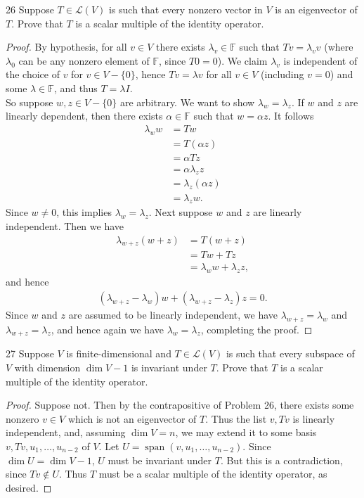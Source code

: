 \documentclass{extarticle}
\newenvironment{problem}[1]{\begin{prob*}{#1}{}}{\end{prob*}}
\newcommand{\F}{\mathbb{F}}
\DeclareMathOperator{\Span}{span}
\newcommand{\Hom}{\mathcal{L}}
\begin{document}
\begin{problem}{26}
Suppose $T\in\Hom(V)$ is such that every nonzero vector in $V$ is an eigenvector of $T$.  Prove that $T$ is a scalar multiple of the identity operator.
\end{problem}
\begin{proof}
By hypothesis, for all $v\in V$ there exists $\lambda_v\in\F$ such that $Tv = \lambda_v v$ (where $\lambda_0$ can be any nonzero element of $\F$, since $T0 = 0$).  We claim $\lambda_v$ is independent of the choice of $v$ for $v\in V-\{0\}$, hence $Tv = \lambda v$ for all $v\in V$ (including $v = 0$) and some $\lambda \in \F$, and thus $T = \lambda I$.\\
\indent So suppose $w,z\in V-\{0\}$ are arbitrary.  We want to show $\lambda_w = \lambda_z$.  If $w$ and $z$ are linearly dependent, then there exists $\alpha\in\F$ such that $w=\alpha z$.  It follows
\begin{align*}
\lambda_w w &= Tw\\
&= T(\alpha z)\\
&= \alpha Tz \\
&= \alpha \lambda_z z\\
&= \lambda_z (\alpha z)\\
&= \lambda_z w.
\end{align*}
Since $w\neq 0$, this implies $\lambda_w = \lambda_z$.  Next suppose $w$ and $z$ are linearly independent.  Then we have
\begin{align*}
\lambda_{w + z} (w + z)&= T(w + z)\\
&= Tw + Tz\\
&= \lambda_w w + \lambda_z z,
\end{align*}
and hence
\begin{align*}
(\lambda_{w + z} - \lambda_w)w + (\lambda_{w + z} - \lambda_z)z = 0.
\end{align*}
Since $w$ and $z$ are assumed to be linearly independent, we have $\lambda_{w + z} = \lambda_w$ and $\lambda_{w + z} = \lambda_z$, and hence again we have $\lambda_w = \lambda_z$, completing the proof.
\end{proof}

\begin{problem}{27}
Suppose $V$ is finite-dimensional and $T\in\Hom(V)$ is such that every subspace of $V$ with dimension $\dim V - 1$ is invariant under $T$.  Prove that $T$ is a scalar multiple of the identity operator.
\end{problem}
\begin{proof}
Suppose not.  Then by the contrapositive of Problem 26, there exists some nonzero $v\in V$ which is not an eigenvector of $T$.  Thus the list $v, Tv$ is linearly independent, and, assuming $\dim V = n$, we may extend it to some basis $v, Tv, u_1, \dots, u_{n-2}$ of $V$.  Let $U = \Span(v, u_1,\dots, u_{n-2})$.  Since $\dim U = \dim V - 1$, $U$ must be invariant under $T$.  But this is a contradiction, since $Tv \not\in U$.  Thus $T$ must be a scalar multiple of the identity operator, as desired.
\end{proof}
\end{document}
